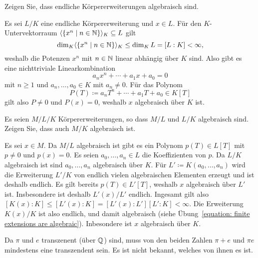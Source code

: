 \begin{question}[subtitle = You should be able to do this]
  \label{equation: finite extensions are algebraic}
  Zeigen Sie, dass endliche Körpererweiterungen algebraisch sind.
\end{question}


\begin{solution}
  Es sei $L/K$ eine endliche Körpererweiterung und $x \in L$.
  Für den $K$-Untervektorraum $\langle \{x^n \mid n \in \mathbb{N}\} \rangle_K \subseteq L$ gilt
  \[
          \dim_K \langle \{x^n \mid n \in \mathbb{N} \} \rangle_K
    \leq  \dim_K L
    =     [L : K]
    <     \infty,
  \]
  weshalb die Potenzen $x^n$ mit $n \in \mathbb{N}$ linear abhängig über $K$ sind.
  Also gibt es eine nichttriviale Linearkombination
  \[
    a_n x^n + \dotsb + a_1 x + a_0 = 0
  \]
  mit $n \geq 1$ und $a_n, \dotsc, a_0 \in K$ mit $a_n \neq 0$.
  Für das Polynom
  \[
              P(T)
    \coloneqq a_n T^n + \dotsb + a_1 T + a_0
    \in       K[T]
  \]
  gilt also $P \neq 0$ und $P(x) = 0$, weshalb $x$ algebraisch über $K$ ist.
\end{solution}


\begin{question}[subtitle = Transitivität von Algebraizität]
  Es seien $M / L / K$ Körpererweiterungen, so dass $M/L$ und $L/K$ algebraisch sind.
  Zeigen Sie, dass auch $M/K$ algebraisch ist.
\end{question}


\begin{solution}
  Es sei $x \in M$.
  Da $M/L$ algebraisch ist gibt es ein Polynom $p(T) \in L[T]$ mit $p \neq 0$ und $p(x) = 0$.
  Es seien $a_0, \dotsc, a_n \in L$ die Koeffizienten von $p$.
  Da $L/K$ algebraisch ist sind $a_0, \dotsc, a_n$ algebraisch über $K$.
  Für $L' \coloneqq K(a_0, \dotsc, a_n)$ wird die Erweiterung $L'/K$ von endlich vielen algebraischen Elementen erzeugt und ist deshalb endlich.
  Es gilt bereits $p(T) \in L'[T]$, weshalb $x$ algebraisch über $L'$ ist.
  Insbesondere ist deshalb $L'(x)/L'$ endlich.
  Ingesamt gilt also $[K(x) : K] \leq [L'(x) : K] = [L'(x) : L'][L' : K] < \infty$.
  Die Erweiterung $K(x)/K$ ist also endlich, und damit algebraisch (siehe Übung~\ref{equation: finite extensions are algebraic}).
  Inbesondere ist $x$ algebraisch über $K$.
\end{solution}


\begin{remark*}
  Da $\pi$ und $e$ transzenent (über $\mathbb{Q}$) sind, muss von den beiden Zahlen $\pi + e$ und $\pi e$ mindestens eine transzendent sein.
  Es ist nicht bekannt, welches von ihnen es ist.
\end{remark*}


